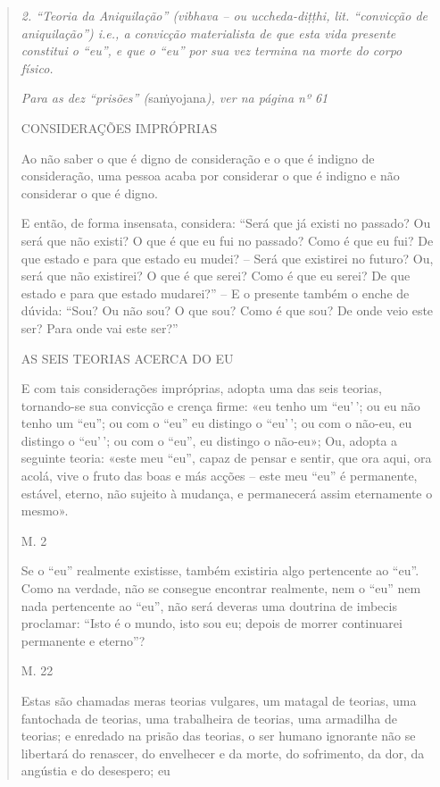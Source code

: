 \begin{quote}
\emph{2. ``Teoria da Aniquilação'' (vibhava -- ou uccheda-diṭṭhi, lit. ``convicção de aniquilação'') i.e., a convicção materialista de que esta vida presente constitui o ``eu'', e que o ``eu'' por sua vez termina na morte do corpo físico.}

\emph{Para as dez ``prisões'' (}saṁyojana\emph{), ver na página nº 61}

CONSIDERAÇÕES IMPRÓPRIAS

Ao não saber o que é digno de consideração e o que é indigno de consideração, uma pessoa acaba por considerar o que é indigno e não considerar o que é digno.

E então, de forma insensata, considera: ``Será que já existi no passado? Ou será que não existi? O que é que eu fui no passado? Como é que eu fui? De que estado e para que estado eu mudei? -- Será que existirei no futuro? Ou, será que não existirei? O que é que serei? Como é que eu serei? De que estado e para que estado mudarei?'' -- E o presente também o enche de dúvida: ``Sou? Ou não sou? O que sou? Como é que sou? De onde veio este ser? Para onde vai este ser?''

AS SEIS TEORIAS ACERCA DO EU

E com tais considerações impróprias, adopta uma das seis teorias, tornando-se sua convicção e crença firme: «eu tenho um ``eu'\,'; ou eu não tenho um ``eu''; ou com o ``eu'' eu distingo o ``eu'\,'; ou com o não-eu, eu distingo o ``eu'\,'; ou com o ``eu'', eu distingo o não-eu»; Ou, adopta a seguinte teoria: «este meu ``eu'', capaz de pensar e sentir, que ora aqui, ora acolá, vive o fruto das boas e más acções -- este meu ``eu'' é permanente, estável, eterno, não sujeito à mudança, e permanecerá assim eternamente o mesmo».

M. 2

Se o ``eu'' realmente existisse, também existiria algo pertencente ao ``eu''. Como na verdade, não se consegue encontrar realmente, nem o ``eu'' nem nada pertencente ao ``eu'', não será deveras uma doutrina de imbecis proclamar: ``Isto é o mundo, isto sou eu; depois de morrer continuarei permanente e eterno''?

M. 22

Estas são chamadas meras teorias vulgares, um matagal de teorias, uma fantochada de teorias, uma trabalheira de teorias, uma armadilha de teorias; e enredado na prisão das teorias, o ser humano ignorante não se libertará do renascer, do envelhecer e da morte, do sofrimento, da dor, da angústia e do desespero; eu


\end{quote}
